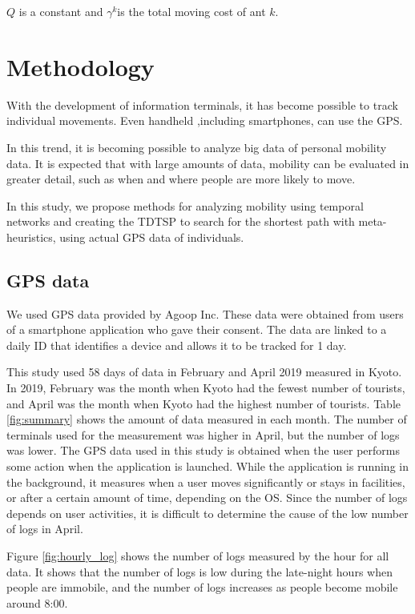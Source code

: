 \documentclass[conference]{IEEEtran}
\begin{document}
 $Q$ is a constant and $\gamma ^k$is the total moving cost of ant $k$.

\section{Methodology}
\label{sec:meth}
\par With the development of information terminals, it has become possible to track individual movements.
Even handheld ,including smartphones, can use the GPS.
\par In this trend, it is becoming possible to analyze big data of personal mobility data.
It is expected that with large amounts of data, mobility can be evaluated in greater detail, such as when and where people are more likely to move.
\par In this study, we propose methods for analyzing mobility using temporal networks and creating the TDTSP to search for the shortest path with meta-heuristics, using actual GPS data of individuals.

\subsection{GPS data}
\par We used GPS data provided by Agoop Inc.
These data were obtained from users of a smartphone application who gave their consent.
The data are linked to a daily ID that identifies a device and allows it to be tracked for 1 day.

\par This study used 58 days of data in February and April 2019 measured in Kyoto.
In 2019, February was the month when Kyoto had the fewest number of tourists, and April was the month when Kyoto had the highest number of tourists.
Table \ref{fig:summary} shows the amount of data measured in each month.
The number of terminals used for the measurement was higher in April, but the number of logs was lower.
The GPS data used in this study is obtained when the user performs some action when the application is launched. 
While the application is running in the background, it measures when a user moves significantly or stays in facilities, or after a certain amount of time, depending on the OS.
Since the number of logs depends on user activities, it is difficult to determine the cause of the low number of logs in April.

\par Figure \ref{fig:hourly_log} shows the number of logs measured by the hour for all data.
It shows that the number of logs is low during the late-night hours when people are immobile, and the number of logs increases as people become mobile around 8:00.
\end{document}
